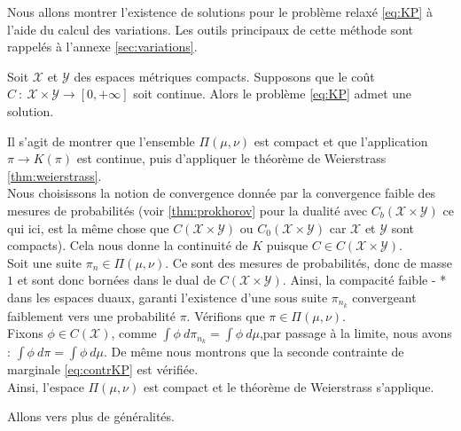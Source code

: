 \documentclass[a4paper,12pt]{article}
\begin{document}
Nous allons montrer l'existence de solutions pour le problème relaxé \eqref{eq:KP} à l'aide du calcul des variations. Les outils principaux de cette méthode sont rappelés à l'annexe \ref{sec:variations}. 
\begin{theoreme}{}
Soit $\mathcal{X}$ et $\mathcal{Y}$ des espaces métriques compacts. Supposons que le coût $C\ :\ \mathcal{X}\times\mathcal{Y}\rightarrow [0,+\infty]$ soit continue. Alors le problème \eqref{eq:KP} admet une solution.
\end{theoreme}
\begin{preuve}
Il s'agit de montrer que l'ensemble $\Pi (\mu,\nu)$ est compact et que l'application $\pi\rightarrow K(\pi )$ est continue, puis d'appliquer le théorème de Weierstrass \eqref{thm:weierstrass}. \\
Nous choisissons la notion de convergence donnée par la convergence faible des mesures de probabilités (voir \eqref{thm:prokhorov} pour la dualité avec $C_b(\mathcal{X}\times\mathcal{Y})$ ce qui ici, est la même chose que $C(\mathcal{X}\times\mathcal{Y})$ ou $C_0(\mathcal{X}\times\mathcal{Y})$ car $\mathcal{X}$ et $\mathcal{Y}$ sont compacts). Cela nous donne la continuité de $K$ puisque $C\in C(\mathcal{X}\times\mathcal{Y})$. \\

Soit une suite $\pi_n\in\Pi (\mu,\nu )$. Ce sont des mesures de probabilités, donc de masse $1$ et sont donc bornées dans le dual de $C(\mathcal{X}\times\mathcal{Y})$. Ainsi, la compacité faible - * dans les espaces duaux, garanti l'existence d'une sous suite $\pi_{n_k}$ convergeant faiblement vers une probabilité $\pi$. 
Vérifions que $\pi \in \Pi (\mu,\nu )$. \\
Fixons $\phi\in C(\mathcal{X})$, comme $\int\phi\ d\pi_{n_k} =\int \phi\ d\mu $,par passage à la limite, nous avons : $\int\phi\ d\pi =\int\phi\ d\mu$. De même nous montrons que la seconde contrainte de marginale \eqref{eq:contrKP} est vérifiée. \\
Ainsi, l'espace $\Pi(\mu,\nu)$ est compact et le théorème de Weierstrass s'applique.
\end{preuve}

Allons vers plus de généralités. 
\end{document}
